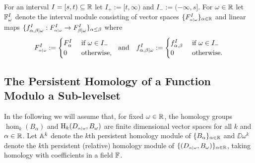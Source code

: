 For an interval $I = [s,t)\subseteq \R$ let $I_+ := [t,\infty)$ and $I_- := (-\infty, s]$.
%
For $\omega\in\R$ let $\FF_\omega^I$ denote the interval module consisting of vector spaces $\{F\subi{\omega}{\alpha}^I\}_{\alpha\in\R}$ and linear maps $\{f_{\alpha,\beta\mid \omega}^I : F\subi{\omega}{\alpha}^I\to F_{\beta\mid\omega}^I\}_{\alpha\leq\beta}$ where
\[ F\subi{\omega}{\alpha}^I := \begin{cases} F_\alpha^I&\text{ if } \omega\in I_-\\ 0&\text{ otherwise,}\end{cases}\ \text{ and }\ \ f_{\alpha,\beta\mid\omega}^I := \begin{cases} f_{\alpha,\beta}^I&\text{ if } \omega\in I_-\\ 0&\text{ otherwise.}\end{cases}\]

\subsection{The Persistent Homology of a Function Modulo a Sub-levelset}

In the following we will assume that, for fixed $\omega\in\R$, the homology groups $\hom_k(B_\alpha)$ and $\hom_k(D\subi{\omega}{\alpha}, B_\omega)$ are finite dimensional vector spaces for all $k$ and $\alpha\in\R$.
Let $\AA^k$ denote the $k$th persistent homology module of $\{B_\alpha\}_{\alpha\in\R}$ and $\DD{\omega}^k$ denote the $k$th persistent (relative) homology module of $\{(D\subi{\omega}{\alpha},B_\omega)\}_{\alpha\in\R}$, taking homology with coefficients in a field $\FF$.

